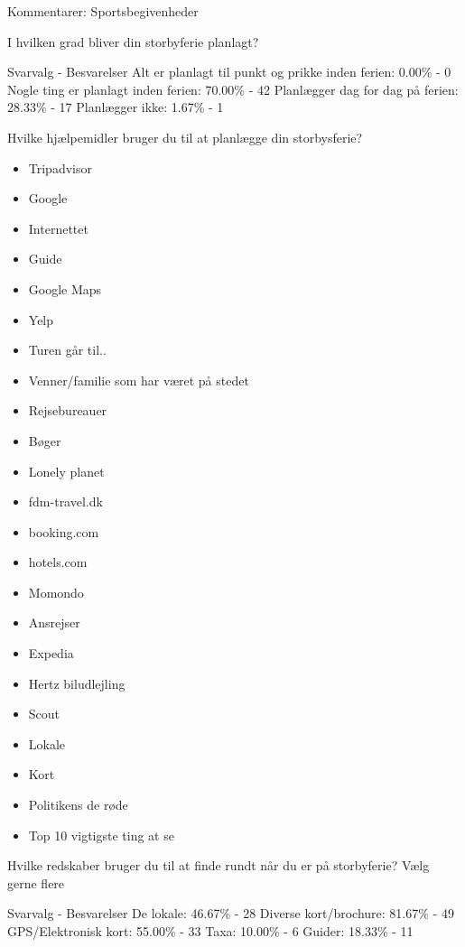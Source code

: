 Kommentarer:
Sportsbegivenheder

I hvilken grad bliver din storbyferie planlagt?

Svarvalg - Besvarelser \newline
Alt er planlagt til punkt og prikke inden ferien:
0.00\% - 0 \newline
Nogle ting er planlagt inden ferien:
70.00\% - 42 \newline
Planlægger dag for dag på ferien:
28.33\%  -  17 \newline
Planlægger ikke:
1.67\%  -  1

Hvilke hjælpemidler bruger du til at planlægge din storbysferie?

\begin{itemize}
	\item Tripadvisor
	\item Google
	\item Internettet
	\item Guide
	\item Google Maps
	\item Yelp
	\item Turen går til..
	\item Venner/familie som har været på stedet
	\item Rejsebureauer
	\item Bøger
	\item Lonely planet
	\item fdm-travel.dk
	\item booking.com
	\item hotels.com
	\item Momondo
	\item Ansrejser
	\item Expedia
	\item Hertz biludlejling
	\item Scout
	\item Lokale
	\item Kort
	\item Politikens de røde
	\item Top 10 vigtigste ting at se
\end{itemize}

Hvilke redskaber bruger du til at finde rundt når du er på storbyferie?
Vælg gerne flere

Svarvalg - Besvarelser\newline
De lokale:
46.67\%  -  28 \newline
Diverse kort/brochure:
81.67\%  -  49 \newline
GPS/Elektronisk kort:
55.00\%  -  33 \newline
Taxa:
10.00\%  -   6 \newline
Guider:
18.33\% - 11 \newline


